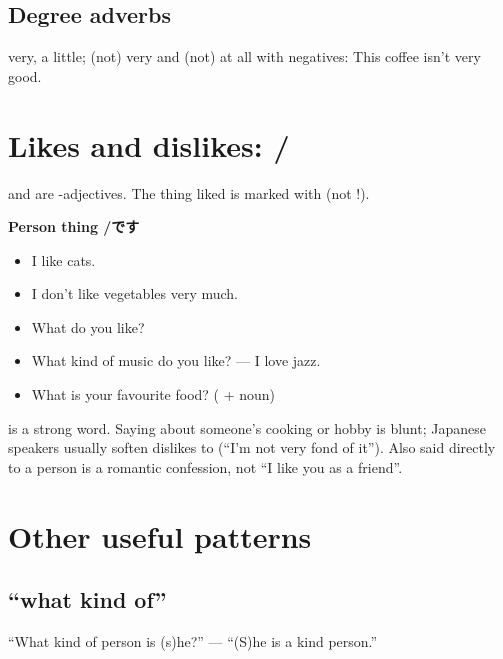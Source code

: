 \subsection{Degree adverbs}
 very,  a little;  (not) very and 
(not) at all with negatives:
 This coffee isn't very good.

\section{Likes and dislikes: /}

 and  are -adjectives. The thing liked is marked with 
(not !).
\begin{center}
\textbf{Person  thing  /です}
\end{center}

\begin{example}
\leavevmode
\begin{itemize}
  \item {} I like cats.
  \item {} I don't like vegetables very much.
  \item {} What do you like?
  \item {} What kind of music do you like?
        ---  I love jazz.
  \item {} What is your favourite food? ( + noun)
\end{itemize}
\end{example}

\begin{aside}
 is a strong word. Saying  about someone's cooking or hobby is
blunt; Japanese speakers usually soften dislikes to 
(``I'm not very fond of it''). Also  said directly to a person is a romantic
confession, not ``I like you as a friend''.
\end{aside}

\section{Other useful patterns}

\subsection{ ``what kind of''}
 ``What kind of person is (s)he?'' ---
 ``(S)he is a kind person.''

